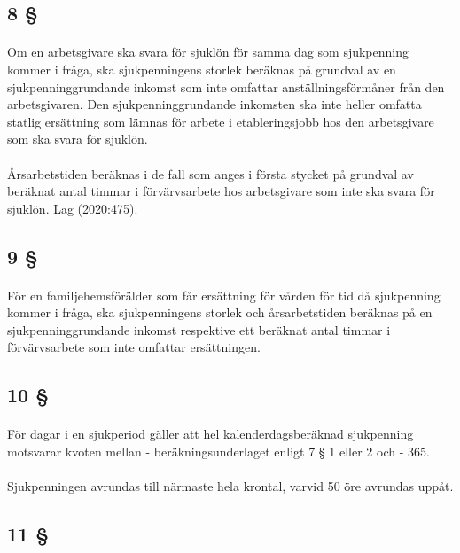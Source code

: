 \documentclass[a4paper,notitlepage,openany,10pt]{book}
\begin{document}
\subsection*{8 §}
\paragraph*{}
Om en arbetsgivare ska svara för sjuklön för samma dag som sjukpenning kommer i fråga, ska sjukpenningens storlek beräknas på grundval av en sjukpenninggrundande inkomst som inte omfattar anställningsförmåner från den arbetsgivaren. Den sjukpenninggrundande inkomsten ska inte heller omfatta statlig ersättning som lämnas för arbete i etableringsjobb hos den arbetsgivare som ska svara för sjuklön.
\paragraph*{}
Årsarbetstiden beräknas i de fall som anges i första stycket på grundval av beräknat antal timmar i förvärvsarbete hos arbetsgivare som inte ska svara för sjuklön.
Lag (2020:475).
\subsection*{9 §}
\paragraph*{}
För en familjehemsförälder som får ersättning för vården för tid då sjukpenning kommer i fråga, ska sjukpenningens storlek och årsarbetstiden beräknas på en sjukpenninggrundande inkomst respektive ett beräknat antal timmar i förvärvsarbete som inte omfattar ersättningen.
\subsection*{10 §}
\paragraph*{}
För dagar i en sjukperiod gäller att hel kalenderdagsberäknad sjukpenning motsvarar kvoten mellan
\newline - beräkningsunderlaget enligt 7 § 1 eller 2 och
\newline - 365.
\paragraph*{}
Sjukpenningen avrundas till närmaste hela krontal, varvid 50 öre avrundas uppåt.
\subsection*{11 §}
\end{document}

